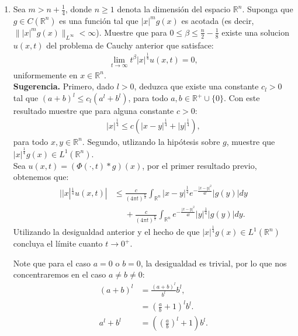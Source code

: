 \begin{homeworkProblem}
\begin{enumerate}
\begin{solucion}
      \demostrado
    \end{solucion}
    \newpage
    \item Sea $m>n+\frac{1}{4}$, donde $n\geq 1$ denota la dimensión del espacio $\mathbb{R}^{n}$. Suponga que $g\in C(\mathbb{R}^{n})$ es una función tal que $|x|^mg(x)$ es acotada (es decir, $\||x|^mg(x)\|_{L^{\infty}}<\infty$). Muestre que para $0 \leq \beta \leq \frac{n}{2}-\frac{1}{8}$ existe una solucion $u(x,t)$ del problema de Cauchy anterior que satisface:
      \begin{align*}
        \lim_{t \rightarrow \infty}t^{\beta}|x|^{\frac{1}{4}}u(x,t)=0,
      \end{align*}
      uniformemente en $x\in\mathbb{R}^{n}$.\\
      \textbf{Sugerencia.} Primero, dado $l>0$, deduzca que existe una constante $c_l>0$ tal que $(a+b)^{l}\leq c_l(a^l+b^l)$, para todo $a,b\in\mathbb{R}^{+}\cup\{0\}$. Con este resultado muestre que para alguna constante $c>0$:
      \begin{align*}
        |x|^{\frac{1}{4}}\leq c(|x-y|^{\frac{1}{4}}+|y|^{\frac{1}{4}}),
      \end{align*}
      para todo $x,y\in\mathbb{R}^{n}$. Segundo, utlizando la hipótesis sobre $g$, muestre que $|x|^{\frac{1}{4}}g(x)\in L^{1}(\mathbb{R}^{n}).$\\
      Sea $u(x,t)=(\Phi(\cdot,t)*g)(x)$, por el primer resultado previo, obtenemos que:
      \begin{align*}
        ||x|^{\frac{1}{4}}u(x,t)|&\leq \frac{c}{(4\pi t)^{\frac{n}{2}}}\int_{\mathbb{R}^{n}}|x-y|^{\frac{1}{4}}e^{-\frac{|x-y|^2}{4t}}|g(y)|dy\\
        &\phantom{=} + \frac{c}{(4\pi t)^{\frac{n}{2}}}\int_{\mathbb{R}^{n}}e^{-\frac{|x-y|^2}{4t}}|y|^{\frac{1}{4}}|g(y)|dy.
      \end{align*}
      Utilizando la desigualdad anterior y el hecho de que $|x|^{\frac{1}{4}}g(x)\in L^{1}(\mathbb{R}^{n})$ concluya el límite cuanto $t\rightarrow 0^{+}$.
    \begin{solucion}
      Note que para el caso $a=0$ o $b=0$, la desigualdad es trivial, por lo que nos concentraremos en el caso $a\neq b\neq 0$:
      \begin{align*}
        (a+b)^{l}&=\frac{(a+b)^l}{b^l}b^l,\\
        &=\left( \frac{a}{b}+1 \right)^{l}b^l.\\
        a^l+b^l&=\left(\left(\frac{a}{b}\right)^l+1\right)b^l.
      \end{align*}

\end{solucion}
\end{enumerate}
\end{homeworkProblem}
